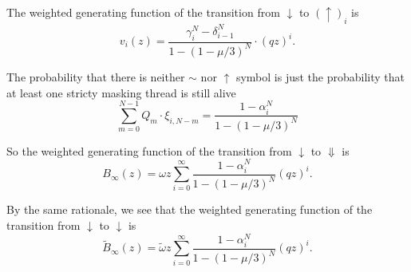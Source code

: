 \documentclass{article}
\begin{document}
The weighted generating function of the transition from $\downarrow$ to
$(\uparrow)_i$ is
\begin{equation}
v_i(z) = \frac{\gamma_i^N- \delta_{i-1}^N}{1-(1-\mu/3)^N} \cdot (qz)^i.
\end{equation}

%

The probability that there is neither $\sim$ nor $\uparrow$ symbol is just
the probability that at least one stricty masking thread is still alive
\begin{equation}
\sum_{m=0}^{N-1}Q_m \cdot \xi_{i,N-m} = \frac{1-\alpha_i^N}{1-(1-\mu/3)^N}
\end{equation}

So the weighted generating function of the transition from $\downarrow$ to
$\Downarrow$ is
\begin{equation}
B_\infty(z) = \omega z\sum_{i=0}^\infty
\frac{1-\alpha_i^N}{1-(1-\mu/3)^N} (qz)^i.
\end{equation}

By the same rationale, we see that the weighted generating function of the
transition from $\downarrow$ to $\downarrow$ is
\begin{equation}
\tilde{B}_\infty(z) = \tilde{\omega} z\sum_{i=0}^\infty
\frac{1-\alpha_i^N}{1-(1-\mu/3)^N} (qz)^i.
\end{equation}
\end{document}
